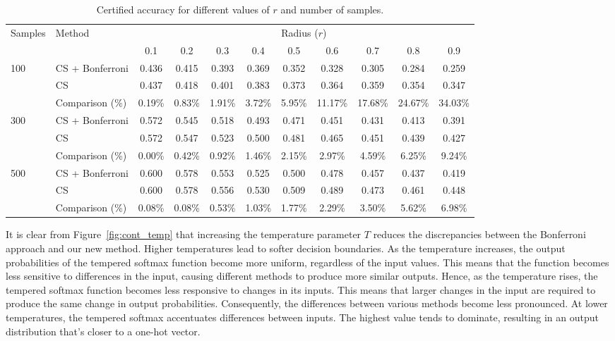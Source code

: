 \begin{table}[htbp]
    \centering
    \caption{Certified accuracy for different values of $r$ and number of samples.}
    \label{tab:certified-accuracy-2}
    \renewcommand{\arraystretch}{1.2}
    \begin{tabular}{@{}ll*{9}{c}@{}}
        \toprule
        \multirow{2}{*}{Samples} & \multirow{2}{*}{Method} & \multicolumn{9}{c}{Radius ($r$)} \\
        \cmidrule(l){3-11}
        & & 0.1 & 0.2 & 0.3 & 0.4 & 0.5 & 0.6 & 0.7 & 0.8 & 0.9 \\
        \midrule
        \multirow{3}{*}{100}
        & CS + Bonferroni & 0.436 & 0.415 & 0.393 & 0.369 & 0.352 & 0.328 & 0.305 & 0.284 & 0.259 \\
        & CS              & 0.437 & 0.418 & 0.401 & 0.383 & 0.373 & 0.364 & 0.359 & 0.354 & 0.347 \\
        & Comparison (\%) & 0.19\% & 0.83\% & 1.91\% & 3.72\% & 5.95\% & 11.17\% & 17.68\% & 24.67\% & 34.03\% \\
        \midrule
        \multirow{3}{*}{300}
        & CS + Bonferroni & 0.572 & 0.545 & 0.518 & 0.493 & 0.471 & 0.451 & 0.431 & 0.413 & 0.391 \\
        & CS              & 0.572 & 0.547 & 0.523 & 0.500 & 0.481 & 0.465 & 0.451 & 0.439 & 0.427 \\
        & Comparison (\%) & 0.00\% & 0.42\% & 0.92\% & 1.46\% & 2.15\% & 2.97\% & 4.59\% & 6.25\% & 9.24\% \\
        \midrule
        \multirow{3}{*}{500}
        & CS + Bonferroni & 0.600 & 0.578 & 0.553 & 0.525 & 0.500 & 0.478 & 0.457 & 0.437 & 0.419 \\
        & CS              & 0.600 & 0.578 & 0.556 & 0.530 & 0.509 & 0.489 & 0.473 & 0.461 & 0.448 \\
        & Comparison (\%) & 0.08\% & 0.08\% & 0.53\% & 1.03\% & 1.77\% & 2.29\% & 3.50\% & 5.62\% & 6.98\% \\
        \bottomrule
    \end{tabular}
\end{table}

It is clear from Figure~\ref{fig:cont_temp} that increasing the temperature parameter $T$ reduces the discrepancies between the Bonferroni approach and our new method.
Higher temperatures lead to softer decision boundaries.
As the temperature increases, the output probabilities of the tempered softmax function become more uniform, regardless of the input values.
This means that the function becomes less sensitive to differences in the input, causing different methods to produce more similar outputs.
Hence, as the temperature rises, the tempered softmax function becomes less responsive to changes in its inputs.
This means that larger changes in the input are required to produce the same change in output probabilities.
Consequently, the differences between various methods become less pronounced.
At lower temperatures, the tempered softmax accentuates differences between inputs.
The highest value tends to dominate, resulting in an output distribution that's closer to a one-hot vector.
